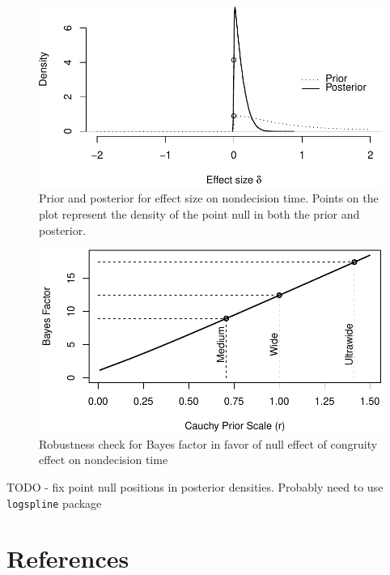 \documentclass[english,floatsintext,doc]{apa6}
\theoremstyle{definition}
\theoremstyle{definition}
\theoremstyle{definition}
\theoremstyle{remark}
\begin{document}
\begin{figure}
\centering
\includegraphics{supplement_files/figure-latex/thetaPosterior-1.pdf}
\caption{\label{fig:thetaPosterior}Prior and posterior for effect size on
nondecision time. Points on the plot represent the density of the point
null in both the prior and posterior.}
\end{figure}

\begin{figure}
\centering
\includegraphics{supplement_files/figure-latex/thetaRobustness-1.pdf}
\caption{\label{fig:thetaRobustness}Robustness check for Bayes factor in
favor of null effect of congruity effect on nondecision time}
\end{figure}

TODO - fix point null positions in posterior densities. Probably need to
use \texttt{logspline} package

\newpage

\section{References}\label{references}

\setlength{\parindent}{-0.5in} \setlength{\leftskip}{0.5in}
\end{document}
